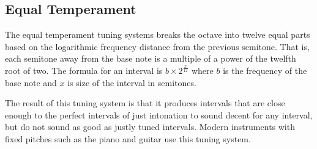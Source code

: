 \subsection{Equal Temperament} \label{mathinmusic:intervals:equal}

The equal temperament tuning systems breaks the octave into twelve equal parts based on the logarithmic frequency distance from the previous semitone.
That is, each semitone away from the base note is a multiple of a power of the twelfth root of two.
The formula for an interval is $b \times 2^{\frac{x}{12}}$ where $b$ is the frequency of the base note and $x$ is size of the interval in semitones.

The result of this tuning system is that it produces intervals that are close enough to the perfect intervals of just intonation to sound decent for any interval, but do not sound as good as justly tuned intervals.
Modern instruments with fixed pitches such as the piano and guitar use this tuning system.




